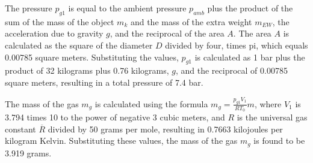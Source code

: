 The pressure \( p_{g1} \) is equal to the ambient pressure \( p_{amb} \) plus the product of the sum of the mass of the object \( m_k \) and the mass of the extra weight \( m_{EW} \), the acceleration due to gravity \( g \), and the reciprocal of the area \( A \). The area \( A \) is calculated as the square of the diameter \( D \) divided by four, times pi, which equals 0.00785 square meters. Substituting the values, \( p_{g1} \) is calculated as 1 bar plus the product of 32 kilograms plus 0.76 kilograms, \( g \), and the reciprocal of 0.00785 square meters, resulting in a total pressure of 7.4 bar.

The mass of the gas \( m_g \) is calculated using the formula \( m_g = \frac{p_{g1} V_1}{R T_0} m \), where \( V_1 \) is 3.794 times 10 to the power of negative 3 cubic meters, and \( R \) is the universal gas constant \( \overline{R} \) divided by 50 grams per mole, resulting in 0.7663 kilojoules per kilogram Kelvin. Substituting these values, the mass of the gas \( m_g \) is found to be 3.919 grams.